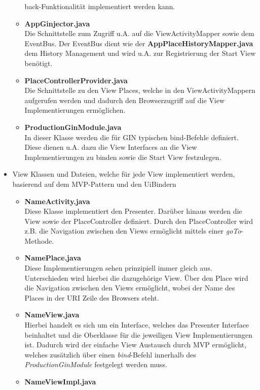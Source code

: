 \begin{itemize}
\begin{itemize}
    back-Funktionalität implementiert werden kann.
    \item \textbf{AppGinjector.java}\\
    Die Schnittstelle zum Zugriff u.A. auf die
    ViewActivityMapper sowie dem EventBus. Der EventBus dient
    wie der \textbf{AppPlaceHistoryMapper.java} dem History Management und wird
    u.A. zur Registrierung der Start View benötigt.
    \item \textbf{PlaceControllerProvider.java}\\
    Die Schnittstelle zu den View Places, welche in
    den ViewActivityMappern aufgerufen werden und dadurch den Browserzugriff 
    auf die View Implementierungen ermöglichen.
    \item \textbf{ProductionGinModule.java}\\
    In dieser Klasse werden die für GIN typischen bind-Befehle definiert. Diese
    dienen u.A. dazu die View Interfaces an die View Implementierungen zu
    binden sowie die Start View festzulegen.
  \end{itemize}  
  \item View Klassen und Dateien, welche für jede View implementiert werden,
  basierend auf dem MVP-Pattern und den UiBindern
    \begin{itemize}
    \item \textbf{\grqq{}Name\grqq{}Activity.java}\\
    Diese Klasse implementiert den Presenter. Darüber hinaus werden die View
    sowie der PlaceController definiert. Durch den PlaceController wird z.B. die
    Navigation zwischen den Views ermöglicht mittels einer \textit{goTo}-Methode.
    \item \textbf{\grqq{}Name\grqq{}Place.java}\\
    Diese Implementierungen sehen prinzipiell immer gleich aus. Unterschieden
    wird hierbei die dazugehörige View. Über den Place wird die
    Navigation zwischen den Views ermöglicht, wobei der Name des Places in der
    URI Zeile des Browsers steht.
    \item \textbf{\grqq{}Name\grqq{}View.java}\\
    Hierbei handelt es sich um ein Interface, welches das Presenter Interface
    beinhaltet und die Oberklasse für die jeweiligen View Implementierungen ist.
    Dadurch wird der einfache View Austausch durch MVP ermöglicht, welches
    zusätzlich über einen \textit{bind}-Befehl innerhalb des \textit{ProductionGinModule} festgelegt
    werden muss.
    \item \textbf{\grqq{}Name\grqq{}ViewImpl.java}\\

\end{itemize}
\end{itemize}
